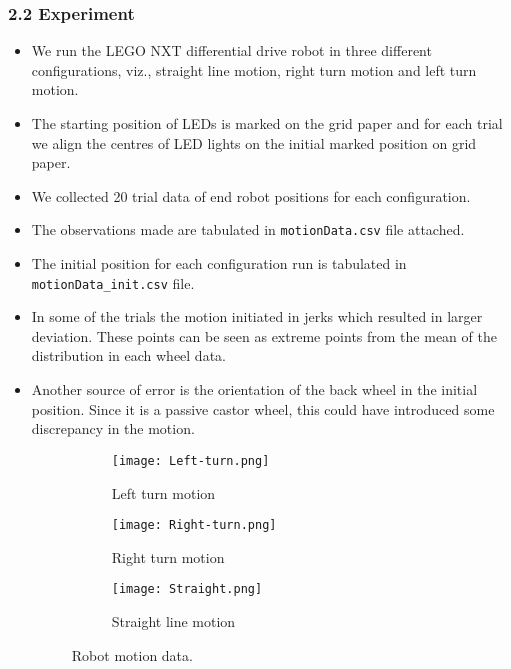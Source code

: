 \subsubsection*{2.2 Experiment}
\begin{itemize}
\item We run the LEGO NXT differential drive robot in three different configurations, viz., straight line motion, right turn motion and left turn motion.
\item The starting position of LEDs is marked on the grid paper and for each trial we align the centres of LED lights on the initial marked position on grid paper.
\item We collected 20 trial data of end robot positions for each configuration.
\item The observations made are tabulated in \texttt{motionData.csv} file attached.
\item The initial position for each configuration run is tabulated in \texttt{motionData\_init.csv} file.
\item In some of the trials the motion initiated in jerks which resulted in larger deviation. These points can be seen as extreme points from the mean of the distribution in each wheel data.
\item Another source of error is the orientation of the back wheel in the initial position. Since it is a passive castor wheel, this could have introduced some discrepancy in the motion.

\begin{figure}[H]
\centering
\begin{subfigure}[b]{0.49\textwidth}
\texttt{[image: Left-turn.png]}
\caption{Left turn motion}
\label{left}
\end{subfigure}
\begin{subfigure}[b]{0.49\textwidth}
\texttt{[image: Right-turn.png]}
\caption{Right turn motion}
\label{right}
\end{subfigure}
\begin{subfigure}[b]{0.49\textwidth}
\texttt{[image: Straight.png]}
\caption{Straight line motion}
\label{straight}
\end{subfigure}
\caption{Robot motion data. {\color{green}{x/y with units defined.}}}
\label{data}
\end{figure}


\end{itemize}
